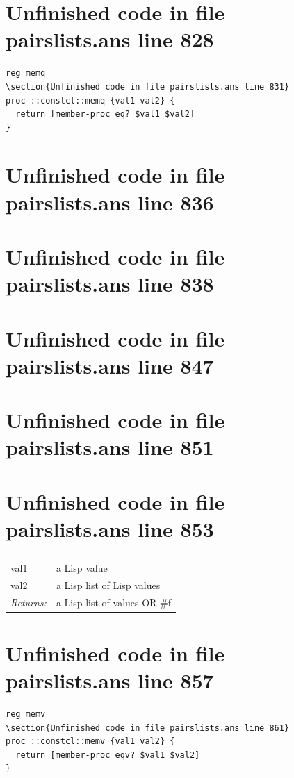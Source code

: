 \documentclass[twoside,9pt]{report}
\begin{document}
\section{Unfinished code in file pairslists.ans line 828}
\begin{lstlisting}
reg memq
\section{Unfinished code in file pairslists.ans line 831}
proc ::constcl::memq {val1 val2} {
  return [member-proc eq? $val1 $val2]
}
\end{lstlisting}
\section{Unfinished code in file pairslists.ans line 836}
\section{Unfinished code in file pairslists.ans line 838}
\section{Unfinished code in file pairslists.ans line 847}
\section{Unfinished code in file pairslists.ans line 851}
\section{Unfinished code in file pairslists.ans line 853}
\noindent\begin{tabular}{ |p{1.9cm} p{8cm}| }
\hline
\rowcolor[HTML]{CCCCCC} \multicolumn{2}{|l|}{\bf memv (public)} \\
val1 & a Lisp value \\
val2 & a Lisp list of Lisp values \\
\textit{Returns:} & a Lisp list of values OR \#f \\
\hline
\end{tabular}
\section{Unfinished code in file pairslists.ans line 857}
\begin{lstlisting}
reg memv
\section{Unfinished code in file pairslists.ans line 861}
proc ::constcl::memv {val1 val2} {
  return [member-proc eqv? $val1 $val2]
}
\end{lstlisting}
\end{document}

